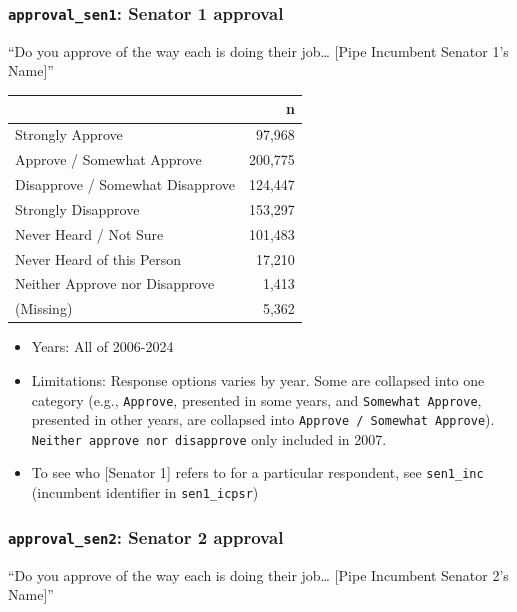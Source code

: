 \documentclass[10pt,article,oneside]{memoir}
\begin{document}
\subsubsection{\texorpdfstring{\texttt{approval\_sen1}: Senator 1
approval}{approval\_sen1: Senator 1 approval}}\label{approval_sen1-senator-1-approval}

``Do you approve of the way each is doing their job\ldots{} {[}Pipe
Incumbent Senator 1's Name{]}''

\begin{table}[H]
\centering
\begin{tabular}[t]{lr}
\toprule
 & n\\
\midrule
Strongly Approve & 97,968\\
Approve / Somewhat Approve & 200,775\\
Disapprove / Somewhat Disapprove & 124,447\\
Strongly Disapprove & 153,297\\
Never Heard / Not Sure & 101,483\\
Never Heard of this Person & 17,210\\
Neither Approve nor Disapprove & 1,413\\
(Missing) & 5,362\\
\bottomrule
\end{tabular}
\end{table}

\begin{itemize}
\tightlist
\item
  Years: All of 2006-2024
\item
  Limitations: Response options varies by year. Some are collapsed into
  one category (e.g., \texttt{Approve}, presented in some years, and
  \texttt{Somewhat\ Approve}, presented in other years, are collapsed
  into \texttt{Approve\ /\ Somewhat\ Approve}).
  \texttt{Neither\ approve\ nor\ disapprove} only included in 2007.
\item
  To see who {[}Senator 1{]} refers to for a particular respondent, see
  \texttt{sen1\_inc} (incumbent identifier in \texttt{sen1\_icpsr})
\end{itemize}

\subsubsection{\texorpdfstring{\texttt{approval\_sen2}: Senator 2
approval}{approval\_sen2: Senator 2 approval}}\label{approval_sen2-senator-2-approval}

``Do you approve of the way each is doing their job\ldots{} {[}Pipe
Incumbent Senator 2's Name{]}''
\end{document}
